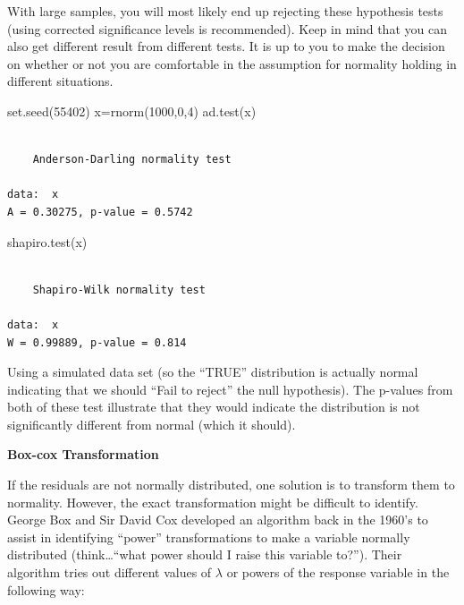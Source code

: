 \documentclass[
  letterpaper,
  DIV=11,
  numbers=noendperiod]{scrreprt}
\newenvironment{Shaded}{\begin{snugshade}}{\end{snugshade}}
\newcommand{\DecValTok}[1]{\textcolor[rgb]{0.68,0.00,0.00}{#1}}
\newcommand{\FunctionTok}[1]{\textcolor[rgb]{0.28,0.35,0.67}{#1}}
\newcommand{\NormalTok}[1]{\textcolor[rgb]{0.00,0.23,0.31}{#1}}
\newcommand{\OtherTok}[1]{\textcolor[rgb]{0.00,0.23,0.31}{#1}}
\begin{document}
With large samples, you will most likely end up rejecting these
hypothesis tests (using corrected significance levels is recommended).
Keep in mind that you can also get different result from different
tests. It is up to you to make the decision on whether or not you are
comfortable in the assumption for normality holding in different
situations.

\begin{Shaded}
\begin{Highlighting}[]
\FunctionTok{set.seed}\NormalTok{(}\DecValTok{55402}\NormalTok{)}
\NormalTok{x}\OtherTok{=}\FunctionTok{rnorm}\NormalTok{(}\DecValTok{1000}\NormalTok{,}\DecValTok{0}\NormalTok{,}\DecValTok{4}\NormalTok{)}
\FunctionTok{ad.test}\NormalTok{(x)}
\end{Highlighting}
\end{Shaded}

\begin{verbatim}

    Anderson-Darling normality test

data:  x
A = 0.30275, p-value = 0.5742
\end{verbatim}

\begin{Shaded}
\begin{Highlighting}[]
\FunctionTok{shapiro.test}\NormalTok{(x)}
\end{Highlighting}
\end{Shaded}

\begin{verbatim}

    Shapiro-Wilk normality test

data:  x
W = 0.99889, p-value = 0.814
\end{verbatim}

Using a simulated data set (so the ``TRUE'' distribution is actually
normal indicating that we should ``Fail to reject'' the null
hypothesis). The p-values from both of these test illustrate that they
would indicate the distribution is not significantly different from
normal (which it should).

\textbf{Box-cox Transformation}

If the residuals are not normally distributed, one solution is to
transform them to normality. However, the exact transformation might be
difficult to identify. George Box and Sir David Cox developed an
algorithm back in the 1960's to assist in identifying ``power''
transformations to make a variable normally distributed
(think\ldots{}``what power should I raise this variable to?''). Their
algorithm tries out different values of \(\lambda\) or powers of the
response variable in the following way:\\
\end{document}
